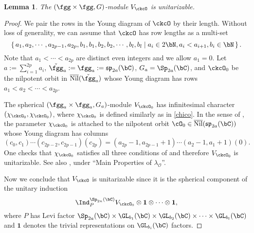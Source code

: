 \documentclass[12pt,a4paper]{amsart}
\newcommand{\bfone}{\mathbf{1}}
\def\fsp{\mathfrak{sp}}
\newcommand{\CO}{{\mathcal {O}}}
\numberwithin{equation}{section}
\newtheorem{lem}[thm]{Lemma}
\theoremstyle{remark}
\def\ckfgg{\check{\fgg}}
\begin{document}
\begin{lem} \label{sunitary}
  The $(\fgg\times \fgg, G)$-module $V_{\ckcO}$ is unitarizable.
\end{lem}
\begin{proof}
  We pair the rows in the Young diagram of $\ckcO$ by their length. Without loss
  of generality, we can assume that
  $\ckcO$ has row lengths as a multi-set
  \[
    \set{a_{1}, a_2,\cdots, a_{2p-1},a_{2p}, b_1, b_1, b_2, b_2, \cdots, b_l,
      b_l| a_i \in 2\bN, a_i < a_{i+1}, b_i \in \bN}.
  \]
  Note that $a_1< \cdots< a_{2p}$ are distinct even integers and we allow $a_1=0$.
  Let $a := \sum_{i=1}^{2p} a_i$,
  $\ckfgg_a:=\fgg_a := \fsp_{2a}(\bC)$, $G_a = \Sp_{2a}(\bC)$,
  and $\ckcO_0$ be the nilpotent orbit in
  $\overline{\mathrm{Nil}}(\ckfgg_a)$ whose Young diagram has rows $a_1<a_2< \cdots<
  a_{2p}$.

  The spherical $(\fgg_a\times \fgg_a, G_a)$-module $V_{\ckcO_0}$ has infinitesimal character $(\chi_{\ckcO_0},\chi_{\ckcO_0})$, where $\chi_{\ckcO_0}$ is defined similarly as in \eqref{chico}.
  In the sense of \cite[Section 2.7]{B17}, the parameter $\chi_{\ckcO_0}$ is attached to the nilpotent orbit $\cO_0\in
  \overline{\mathrm{Nil}}(\fsp_{2a}(\bC))$ whose Young diagram has columns
  \[
    (c_0,c_1)\cdots (c_{2p-2}, c_{2p-1})(c_{2p}) = (a_{2p}-1, a_{2p-1} +1) \cdots (a_{2}-1,
    a_{1}+1)(0).
  \]
  One checks that $\chi_{\ckcO_0}$ satisfies all three conditions of \cite[Proposition~10.6]{B89} and therefore $V_{\ckcO_0}$ is unitarizable.
  See also \cite[Section 2.3]{B17}, under ``Main Properties of $\lambda_{\CO}$''.

  Now we conclude that $V_\ckcO$ is unitarizable since it is the spherical component of the
  unitary induction
  \[
  \Ind^{\Sp_{2n}(\bC)}_{P} V_{\ckcO_0}\otimes \bfone\otimes \cdots\otimes  \bfone,
  \]
  where $P$ has Levi factor $\Sp_{2a}(\bC)\times \GL_{b_1}(\bC) \times
  \GL_{b_2}(\bC) \times \cdots \times \GL_{b_l}(\bC)$ and
  $\bfone$ denotes the trivial representations on
  $\GL_{b_i}(\bC)$ factors.
  \end{proof}
\end{document}
